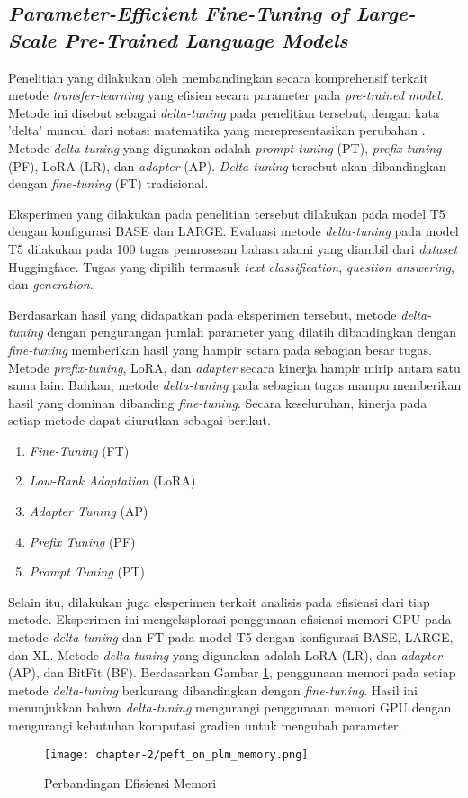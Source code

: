 \subsection{\textit{Parameter-Efficient Fine-Tuning of Large-Scale
Pre-Trained Language Models}}

Penelitian yang dilakukan oleh \citeauthor{peft_on_plm} membandingkan secara komprehensif terkait metode \textit{transfer-learning} yang efisien secara parameter pada \textit{pre-trained model}. Metode ini disebut sebagai \textit{delta-tuning} pada penelitian tersebut, dengan kata 'delta' muncul dari notasi matematika yang merepresentasikan perubahan \parencite{peft_on_plm}. Metode \textit{delta-tuning} yang digunakan adalah \textit{prompt-tuning} (PT), \textit{prefix-tuning} (PF), LoRA (LR), dan \textit{adapter} (AP). \textit{Delta-tuning} tersebut akan dibandingkan dengan \textit{fine-tuning} (FT) tradisional.

Eksperimen yang dilakukan pada penelitian tersebut dilakukan pada model T5 dengan konfigurasi BASE dan LARGE. Evaluasi metode \textit{delta-tuning} pada model T5 dilakukan pada 100 tugas pemrosesan bahasa alami yang diambil dari \textit{dataset} Huggingface. Tugas yang dipilih termasuk \textit{text classification}, \textit{question answering}, dan \textit{generation}.

Berdasarkan hasil yang didapatkan pada eksperimen tersebut, metode \textit{delta-tuning} dengan pengurangan jumlah parameter yang dilatih dibandingkan dengan \textit{fine-tuning} memberikan hasil yang hampir setara pada sebagian besar tugas. Metode \textit{prefix-tuning}, LoRA, dan \textit{adapter} secara kinerja hampir mirip antara satu sama lain. Bahkan, metode \textit{delta-tuning} pada sebagian tugas mampu memberikan hasil yang dominan dibanding \textit{fine-tuning}. Secara keseluruhan, kinerja pada setiap metode dapat diurutkan sebagai berikut.

\begin{enumerate}
    \item \textit{Fine-Tuning} (FT)
    \item \textit{Low-Rank Adaptation} (LoRA)
    \item \textit{Adapter Tuning} (AP)
    \item \textit{Prefix Tuning} (PF)
    \item \textit{Prompt Tuning} (PT)
\end{enumerate}

Selain itu, dilakukan juga eksperimen terkait analisis pada efisiensi dari tiap metode. Eksperimen ini mengeksplorasi penggunaan efisiensi memori GPU pada metode \textit{delta-tuning} dan FT pada model T5 dengan konfigurasi BASE, LARGE, dan XL. Metode \textit{delta-tuning} yang digunakan adalah LoRA (LR), dan \textit{adapter} (AP), dan BitFit (BF). Berdasarkan Gambar \ref{fig:peft_on_plm_memory}, penggunaan memori pada setiap metode \textit{delta-tuning} berkurang dibandingkan dengan \textit{fine-tuning}. Hasil ini menunjukkan bahwa \textit{delta-tuning} mengurangi penggunaan memori GPU dengan mengurangi kebutuhan komputasi gradien untuk mengubah parameter.

\begin{figure}[ht]
    \centering
    \texttt{[image: chapter-2/peft\_on\_plm\_memory.png]}
    \caption{Perbandingan Efisiensi Memori \parencite{peft_on_plm}}
    \label{fig:peft_on_plm_memory}
\end{figure}
